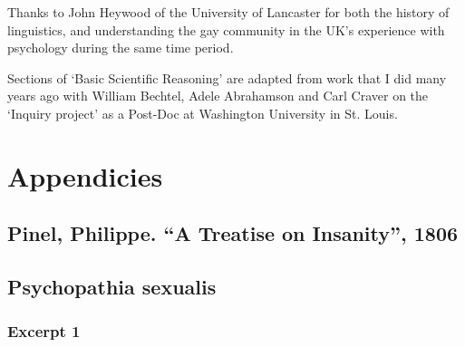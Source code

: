\begin{refsection}
\backmatter
\printbibliography[heading=subbibliography]
\printindex




\pagebreak 

Thanks to John Heywood of the University of Lancaster for both the history of linguistics, and understanding the gay community in the UK's experience with psychology during the same time period.

Sections of `Basic Scientific Reasoning' are adapted from work that I did many years ago with William Bechtel, Adele Abrahamson and Carl Craver on the `Inquiry project' as a Post-Doc at Washington University in St. Louis.

\pagebreak 

 \renewcommand*{\thechapter}{}
\renewcommand*{\thesection}{\Alph{section}}
\setcounter{chapter}{0}
\renewcommand*{\thesubsection}{\arabic{subsection}}



\chapter{Appendicies}
\label{appendicies}

\begin{appendices}
\let\svaddcontentsline\addcontentsline
\renewcommand\addcontentsline[3]{%
  \ifthenelse{\equal{#1}{lof}}{}%
  {\ifthenelse{\equal{#1}{lot}}{}{\svaddcontentsline{#1}{#2}{#3}}}}





\section{Pinel, Philippe. ``A Treatise on Insanity'', 1806}
\label{pinelphilippe.atreatiseoninsanity1806}

\label{app: Pinel}


\section{Psychopathia sexualis}
\label{psychopathiasexualis}

\subsection{Excerpt 1}
\label{excerpt1}

\label{app: KraftEbbing1}



\end{appendices}
\end{refsection}
